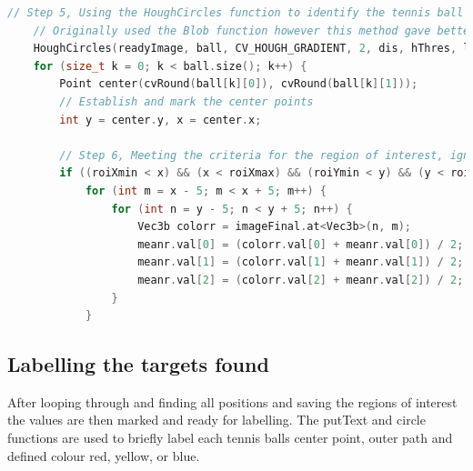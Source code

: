 \documentclass[a4paper, 10pt]{article}
\begin{document}
\begin{lstlisting}[language = C++]
	// Step 5, Using the HoughCircles function to identify the tennis ball radius
	// Originally used the Blob function however this method gave better results
	HoughCircles(readyImage, ball, CV_HOUGH_GRADIENT, 2, dis, hThres, lThres, minRad, maxRad);
	for (size_t k = 0; k < ball.size(); k++) {
		Point center(cvRound(ball[k][0]), cvRound(ball[k][1]));
		// Establish and mark the center points
		int y = center.y, x = center.x;
		
		// Step 6, Meeting the criteria for the region of interest, ignore rest
		if ((roiXmin < x) && (x < roiXmax) && (roiYmin < y) && (y < roiYmax)) {
			for (int m = x - 5; m < x + 5; m++) {
				for (int n = y - 5; n < y + 5; n++) {
					Vec3b colorr = imageFinal.at<Vec3b>(n, m);
					meanr.val[0] = (colorr.val[0] + meanr.val[0]) / 2;
					meanr.val[1] = (colorr.val[1] + meanr.val[1]) / 2;
					meanr.val[2] = (colorr.val[2] + meanr.val[2]) / 2;
				}
			}
\end{lstlisting}

\clearpage
\subsection{Labelling the targets found}

After looping through and finding all positions and saving the regions of interest the values are then marked and ready for labelling. The putText and circle functions are used to briefly label each tennis balls center point, outer path and defined colour red, yellow, or blue.
\end{document}
